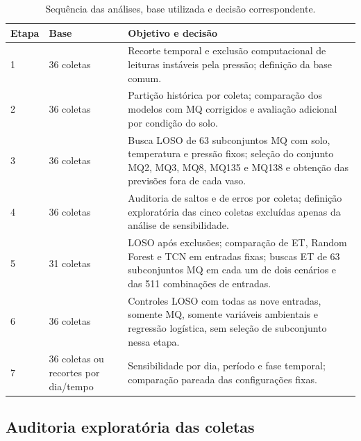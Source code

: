 \begin{table}[H]
    \centering
    \footnotesize
    \caption{Sequência das análises, base utilizada e decisão correspondente.}
    \label{tab:cronologia_analises}
    \begin{tabular}{p{}p{}p{}}
        \hline
        Etapa & Base & Objetivo e decisão \\
        \hline
        1 & 36 coletas & Recorte temporal e exclusão computacional de leituras instáveis pela pressão; definição da base comum. \\
        2 & 36 coletas & Partição histórica por coleta; comparação dos modelos com MQ corrigidos e avaliação adicional por condição do solo. \\
        3 & 36 coletas & Busca LOSO de 63 subconjuntos MQ com solo, temperatura e pressão fixos; seleção do conjunto MQ2, MQ3, MQ8, MQ135 e MQ138 e obtenção das previsões fora de cada vaso. \\
        4 & 36 coletas & Auditoria de saltos e de erros por coleta; definição exploratória das cinco coletas excluídas apenas da análise de sensibilidade. \\
        5 & 31 coletas & LOSO após exclusões; comparação de ET, Random Forest e TCN em entradas fixas; buscas ET de 63 subconjuntos MQ em cada um de dois cenários e das 511 combinações de entradas. \\
        6 & 36 coletas & Controles LOSO com todas as nove entradas, somente MQ, somente variáveis ambientais e regressão logística, sem seleção de subconjunto nessa etapa. \\
        7 & 36 coletas ou recortes por dia/tempo & Sensibilidade por dia, período e fase temporal; comparação pareada das configurações fixas. \\
        \hline
    \end{tabular}
\end{table}


\subsection{Auditoria exploratória das coletas}
\label{subsec:auditoria_coletas_loso}


